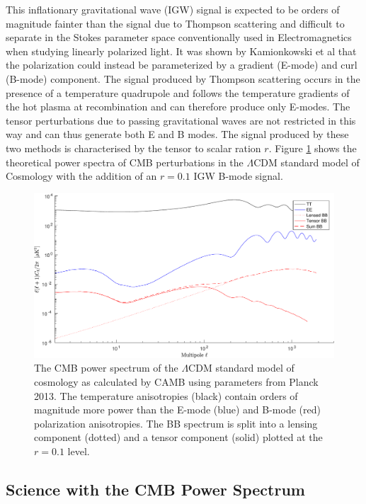 \documentclass[12pt]{article}
\begin{document}
This inflationary gravitational wave (IGW) signal is expected to be orders of
magnitude fainter than the signal due to Thompson scattering and difficult to
separate in the Stokes parameter space conventionally used in
Electromagnetics when studying linearly polarized light. It was shown by Kamionkowski et al
\cite{cite:Kamionkowski} that the polarization could instead be parameterized
by a gradient (E-mode) and curl (B-mode) component. The signal
produced by Thompson scattering occurs in the presence of a temperature
quadrupole and follows the temperature gradients of the hot plasma at
recombination and can therefore produce only E-modes. The tensor perturbations
due to passing gravitational waves are not restricted in this way and can thus
generate both E and B modes. The signal produced by these two methods is characterised by the
tensor to scalar ration $r$. Figure \ref{fig:theory_aps} shows the theoretical
power spectra of CMB perturbations in the $\Lambda$CDM standard model of
Cosmology with the addition of an $r=0.1$ IGW B-mode signal.


\begin{figure}
	\center
	\includegraphics[width=.8\textwidth]{theory_aps.pdf}
	\caption{The CMB power spectrum of the $\Lambda$CDM standard model of
	cosmology as calculated by CAMB using parameters from Planck 2013. The
	temperature anisotropies (black) contain orders of magnitude more power
	than the E-mode (blue) and B-mode (red) polarization anisotropies. The BB
	spectrum is split into a lensing component (dotted) and a tensor component
	(solid) plotted at the $r=0.1$ level.}
	\label{fig:theory_aps}

\end{figure}



\subsection{Science with the CMB Power Spectrum}
\end{document}
